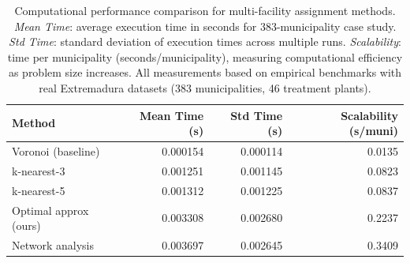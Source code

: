 \begin{table}[htbp]
\caption{Computational performance comparison for multi-facility assignment methods.
\textit{Mean Time}: average execution time in seconds for 383-municipality case study.
\textit{Std Time}: standard deviation of execution times across multiple runs.
\textit{Scalability}: time per municipality (seconds/municipality), measuring computational efficiency as problem size increases.
All measurements based on empirical benchmarks with real Extremadura datasets (383 municipalities, 46 treatment plants).}
\label{tab:multifacility_performance}
\centering
\begin{tabular}{lrrr}
\toprule
Method & Mean Time (s) & Std Time (s) & Scalability (s/muni) \\
\midrule
Voronoi (baseline) & 0.000154 & 0.000114 & 0.0135 \\
k-nearest-3 & 0.001251 & 0.001145 & 0.0823 \\
k-nearest-5 & 0.001312 & 0.001225 & 0.0837 \\
Optimal approx (ours) & 0.003308 & 0.002680 & 0.2237 \\
Network analysis & 0.003697 & 0.002645 & 0.3409 \\
\bottomrule
\end{tabular}
\end{table}
